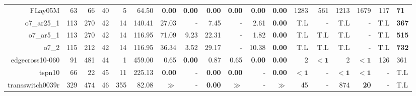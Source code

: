 \begin{table*}[t]
\begin{tabular}{|r|r|r|r|r||r||r|r|r|r|r||r|r|r|r|r|r|}
                           FLay05M &           63 &            66 &           40 &             5 &               64.50 &  \textbf{0.00} &  \textbf{0.00} & \textbf{0.00} &  \textbf{0.00} & \textbf{0.00} & \textbf{0.00} &               1283 &                561 &               1213 &               1679 &          117 &  \textbf{71} \\ 
                       o7\_ar25\_1 &          113 &           270 &           42 &            14 &              140.41 &          27.03 &              - &          7.45 &              - &          2.61 & \textbf{0.00} &                T.L &                  - &                T.L &                  - &          T.L & \textbf{367} \\ 
                        o7\_ar5\_1 &          113 &           270 &           42 &            14 &              116.95 &          71.09 &           9.23 &         22.31 &              - &          1.82 & \textbf{0.00} &                T.L &                T.L &                T.L &                  - &          T.L & \textbf{515} \\ 
                             o7\_2 &          115 &           212 &           42 &            14 &              116.95 &          36.34 &           3.52 &         29.17 &              - &         10.38 & \textbf{0.00} &                T.L &                T.L &                T.L &                  - &          T.L & \textbf{732} \\ 
                   edgecross10-060 &           91 &           481 &           44 &             1 &              459.00 &           0.65 &  \textbf{0.00} &          0.87 &           0.65 & \textbf{0.00} & \textbf{0.00} &                  2 &         $\bm{< 1}$ &                  2 &         $\bm{< 1}$ &          126 &          361 \\ 
                            tspn10 &           66 &            22 &           45 &            11 &              225.13 &  \textbf{0.00} &              - & \textbf{0.00} &  \textbf{0.00} &             - & \textbf{0.00} &         $\bm{< 1}$ &                  - &         $\bm{< 1}$ &         $\bm{< 1}$ &            - &          T.L \\ 
                  transswitch0039r &          329 &           474 &           46 &           355 &               82.08 &          $\gg$ &              - & \textbf{0.00} &          $\gg$ &             - &         $\gg$ &                 45 &                  - &                874 &        \textbf{20} &            - &          T.L \\ 

\end{tabular}
\end{table*}
